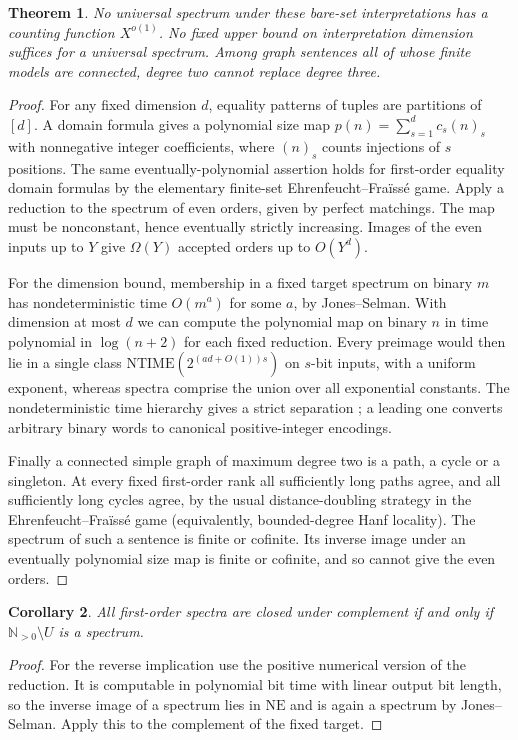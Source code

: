 \documentclass[11pt]{article}
\newtheorem{theorem}{Theorem}
\newtheorem{corollary}[theorem]{Corollary}
\newcommand{\N}{\mathbb N}
\begin{document}
\begin{theorem}\label{limits}
No universal spectrum under these bare-set interpretations has a counting function $X^{o(1)}$. No fixed upper bound on interpretation dimension suffices for a universal spectrum. Among graph sentences all of whose finite models are connected, degree two cannot replace degree three.
\end{theorem}
\begin{proof}
For any fixed dimension $d$, equality patterns of tuples are partitions of $[d]$. A domain formula gives a polynomial size map $p(n)=\sum_{s=1}^d c_s(n)_s$ with nonnegative integer coefficients, where $(n)_s$ counts injections of $s$ positions. The same eventually-polynomial assertion holds for first-order equality domain formulas by the elementary finite-set Ehrenfeucht--Fra\"iss\'e game. Apply a reduction to the spectrum of even orders, given by perfect matchings. The map must be nonconstant, hence eventually strictly increasing. Images of the even inputs up to $Y$ give $\Omega(Y)$ accepted orders up to $O(Y^d)$.

For the dimension bound, membership in a fixed target spectrum on binary $m$ has nondeterministic time $O(m^a)$ for some $a$, by Jones--Selman. With dimension at most $d$ we can compute the polynomial map on binary $n$ in time polynomial in $\log(n+2)$ for each fixed reduction. Every preimage would then lie in a single class $\mathrm{NTIME}(2^{(ad+O(1))s})$ on $s$-bit inputs, with a uniform exponent, whereas spectra comprise the union over all exponential constants. The nondeterministic time hierarchy gives a strict separation \cite{hier}; a leading one converts arbitrary binary words to canonical positive-integer encodings.

Finally a connected simple graph of maximum degree two is a path, a cycle or a singleton. At every fixed first-order rank all sufficiently long paths agree, and all sufficiently long cycles agree, by the usual distance-doubling strategy in the Ehrenfeucht--Fra\"iss\'e game (equivalently, bounded-degree Hanf locality). The spectrum of such a sentence is finite or cofinite. Its inverse image under an eventually polynomial size map is finite or cofinite, and so cannot give the even orders.
\end{proof}

\begin{corollary}
All first-order spectra are closed under complement if and only if $\N_{>0}\setminus U$ is a spectrum.
\end{corollary}
\begin{proof}
For the reverse implication use the positive numerical version of the reduction. It is computable in polynomial bit time with linear output bit length, so the inverse image of a spectrum lies in $\mathrm{NE}$ and is again a spectrum by Jones--Selman. Apply this to the complement of the fixed target.
\end{proof}
\end{document}
